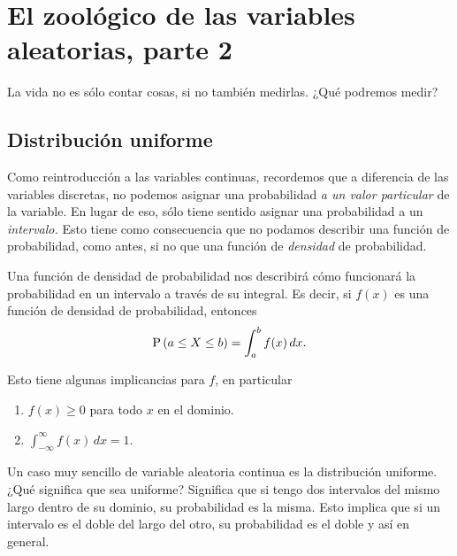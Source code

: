 \chapter{El zoológico de las variables aleatorias, parte 2}

\begin{ideanote}
La vida no es sólo contar cosas, si no también medirlas. ¿Qué podremos medir?
\end{ideanote}

\section{Distribución uniforme}

Como reintroducción a las variables continuas, recordemos que a diferencia de las variables discretas, no podemos asignar una probabilidad \emph{a un valor particular} de la variable. En lugar de eso, sólo tiene sentido asignar una probabilidad a un \emph{intervalo.} Esto tiene como consecuencia que no podamos describir una función de probabilidad, como antes, si no que una función de \emph{densidad} de probabilidad.

Una función de densidad de probabilidad nos describirá cómo funcionará la probabilidad en un intervalo a través de su integral. Es decir, si \(f(x)\) es una función de densidad de probabilidad, entonces \[\operatorname{P}\left(a\leq X\leq b\right) = \int_{a}^{b} f(x)\,dx.\]

Esto tiene algunas implicancias para \(f\), en particular
\begin{enumerate}
\item \(f(x) \geq 0\) para todo \(x\) en el dominio.
\item \(\int_{-\infty}^{\infty}f(x)\,dx = 1\).
\end{enumerate}

Un caso muy sencillo de variable aleatoria continua es la distribución uniforme. ¿Qué significa que sea uniforme? Significa que si tengo dos intervalos del mismo largo dentro de su dominio, su probabilidad es la misma. Esto implica que si un intervalo es el doble del largo del otro, su probabilidad es el doble y así en general.

